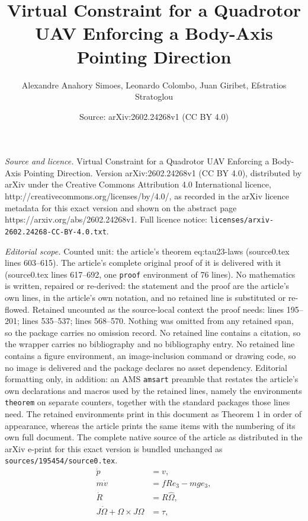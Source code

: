 \documentclass[10pt,a4paper]{amsart}
\title{Virtual Constraint for a Quadrotor UAV Enforcing a Body-Axis Pointing Direction}
\author{Alexandre Anahory Simoes, Leonardo Colombo, Juan Giribet, Efstratios Stratoglou}
\date{Source: arXiv:2602.24268v1 (CC BY 4.0)}
\begin{document}
\maketitle

\noindent\emph{Source and licence.} Virtual Constraint for a Quadrotor UAV Enforcing a Body-Axis Pointing Direction. Version arXiv:2602.24268v1 (CC BY 4.0), distributed by arXiv under the Creative Commons Attribution 4.0 International licence, http://creativecommons.org/licenses/by/4.0/, as recorded in the arXiv licence metadata for this exact version and shown on the abstract page https://arxiv.org/abs/2602.24268v1. Full licence notice: \texttt{licenses/arxiv-2602.24268-CC-BY-4.0.txt}.\par\smallskip

\noindent\textit{Editorial scope.} Counted unit: the article's theorem eq:tau23-laws (source0.tex lines 603--615). The article's complete original proof of it is delivered with it (source0.tex lines 617--692, one \texttt{proof} environment of 76 lines). No mathematics is written, repaired or re-derived: the statement and the proof are the article's own lines, in the article's own notation, and no retained line is substituted or re-flowed.  Retained uncounted as the source-local context the proof needs: lines 195--201; lines 535--537; lines 568--570.  Nothing was omitted from any retained span, so the package carries no omission record.  No retained line contains a citation, so the wrapper carries no bibliography and no bibliography entry.  No retained line contains a figure environment, an image-inclusion command or drawing code, so no image is delivered and the package declares no asset dependency.  Editorial formatting only, in addition: an AMS \texttt{amsart} preamble that restates the article's own declarations and macros used by the retained lines, namely the environments \texttt{theorem} on separate counters, together with the standard packages those lines need.  The retained environments print in this document as Theorem 1 in order of appearance, whereas the article prints the same items with the numbering of its own full document.  The complete native source of the article as distributed in the arXiv e-print for this exact version is bundled unchanged as \texttt{sources/195454/source0.tex}.
\begin{align}
\dot{p} &= v, \label{eq:transl_kin}\\
m \dot{v} &= f R e_3 - m g e_3, \label{eq:transl_dyn}\\
\dot{R} &= R \hat{\Omega}, \label{eq:rot_kin}\\
J \dot{\Omega} + \Omega \times J \Omega &= \tau,
\label{eq:rot_dyn}
\end{align}
\end{document}
